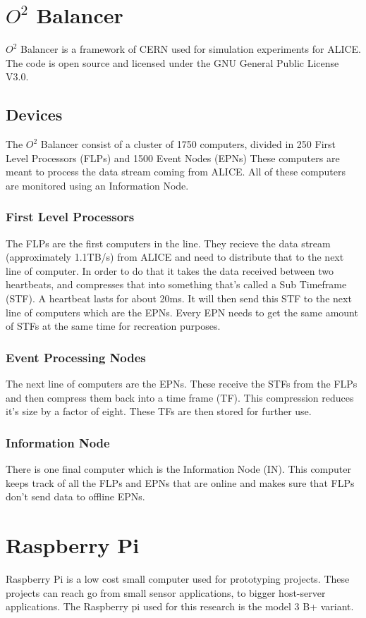 \section{$O^2$ Balancer}
$O^2$ Balancer is a framework of CERN used for simulation experiments for ALICE. The code is open source and licensed under the GNU General Public License V3.0.

\subsection{Devices}
The $O^2$ Balancer consist of a cluster of 1750 computers, divided in 250 First Level Processors (FLPs) and 1500 Event  Nodes (EPNs) These computers are meant to process the data stream coming from ALICE. All of these computers are monitored using an Information Node.

\subsubsection*{First Level Processors}
The FLPs are the first computers in the line. They recieve the data stream (approximately 1.1TB/s) from ALICE and need to distribute that to the next line of computer. In order to do that it takes the data received between two heartbeats, and compresses that into something that's called a Sub Timeframe (STF). A heartbeat lasts for about 20ms. It will then send this STF to the next line of computers which are the EPNs. Every EPN needs to get the same amount of STFs at the same time for recreation purposes.

\subsubsection*{Event Processing Nodes}
The next line of computers are the EPNs. These receive the STFs from the FLPs and then compress them back into a time frame (TF). This compression reduces it's size by a factor of eight. These TFs are then stored for further use.

\subsubsection*{Information Node}
There is one final computer which is the Information Node (IN). This computer keeps track of all the FLPs and EPNs that are online and makes sure that FLPs don't send data to offline EPNs.

\section{Raspberry Pi}
Raspberry Pi is a  low cost small computer used for prototyping projects. These projects can reach go from small sensor applications, to bigger host-server applications. The Raspberry pi used for this research is the model 3 B+ variant.

